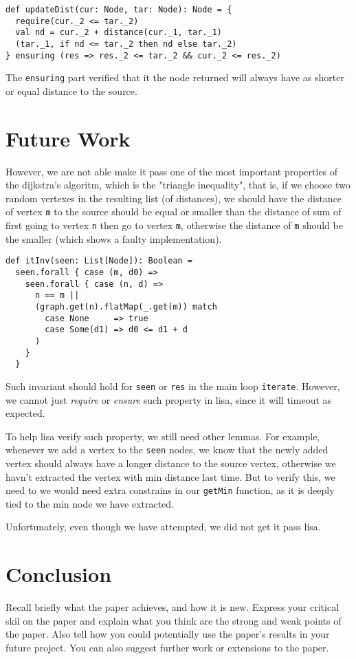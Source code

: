\documentclass[11pt,a4paper]{article}
\begin{document}
\begin{lstlisting}
def updateDist(cur: Node, tar: Node): Node = {
  require(cur._2 <= tar._2)
  val nd = cur._2 + distance(cur._1, tar._1)
  (tar._1, if nd <= tar._2 then nd else tar._2)
} ensuring (res => res._2 <= tar._2 && cur._2 <= res._2)
\end{lstlisting}

The \texttt{ensuring} part verified that it the node returned will always have
as shorter or equal distance to the source.

\section{Future Work}

However, we are not able make it pass one of the most important properties of the 
dijkstra's algoritm, which is the "triangle inequality", that is, if we choose two
random vertexes in the resulting list (of distances), we should have the distance
of vertex \texttt{m} to the source should be equal or smaller than the distance of
sum of first going to vertex \texttt{n} then go to vertex \texttt{m}, otherwise the
distance of \texttt{m} should be the smaller (which shows a faulty implementation).

\begin{lstlisting}
def itInv(seen: List[Node]): Boolean =
  seen.forall { case (m, d0) =>
    seen.forall { case (n, d) =>
      n == m ||
      (graph.get(n).flatMap(_.get(m)) match
        case None     => true
        case Some(d1) => d0 <= d1 + d
      )
    }
  }
\end{lstlisting}

Such invariant should hold for \texttt{seen} or \texttt{res} in the main loop \texttt{iterate}.
However, we cannot just \textit{require} or \textit{ensure} such property in lisa, since it will
timeout as expected.

To help lisa verify such property, we still need other lemmas. For example, whenever we add a vertex
to the \texttt{seen} nodes, we know that the newly added vertex should always have a longer distance
to the source vertex, otherwise we havn't extracted the vertex with min distance last time. But to verify
this, we need to we would need extra constrains in our \texttt{getMin} function, as it is deeply tied
to the min node we have extracted.

Unfortunately, even though we have attempted, we did not get it pass lisa.

\section{Conclusion}
Recall  briefly what the paper achieves, and how it is new. Express your critical skil on the paper and explain what you think are the strong and weak points of the paper. Also tell how you could potentially use the paper's results in your future project. You can also suggest further work or extensions to the paper.




\end{document}
